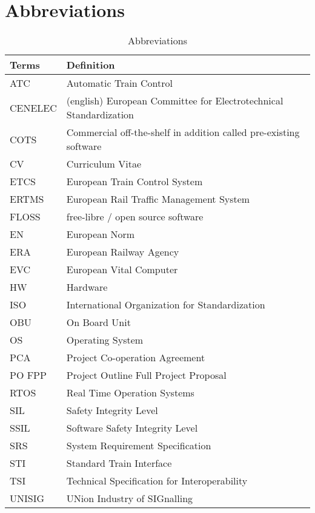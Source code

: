 \documentclass{template/openetcs_report}
\begin{document}
\chapter{Abbreviations}

\begin{table} [h]
\begin{tabular}{|p{2cm}|p{12cm}|}
    \hline\hline
    \bfseries Terms & \bfseries Definition\\
    \hline\hline
    ATC & Automatic Train Control\\
    \hline
    CENELEC & (english) European Committee for Electrotechnical Standardization\\
    \hline
    COTS & Commercial off-the-shelf in addition called pre-existing software\\
    \hline
    CV & Curriculum Vitae\\
    \hline
    ETCS & European Train Control System\\
    \hline
    ERTMS & European Rail Traffic Management System\\
    \hline
    FLOSS & free-libre / open source software\\
    \hline
    EN & European Norm\\
    \hline
    ERA & European Railway Agency\\
    \hline
    EVC & European Vital Computer\\
    \hline
    HW & Hardware\\
    \hline
    ISO & International Organization for Standardization\\
    \hline
    OBU & On Board Unit\\
    \hline
    OS & Operating System\\
    \hline
    PCA & Project Co-operation Agreement\\
    \hline
    PO FPP & Project Outline Full Project Proposal\\
    \hline
    RTOS & Real Time Operation Systems\\
    \hline
    SIL & Safety Integrity Level\\
    \hline
    SSIL & Software Safety Integrity Level\\
    \hline
    SRS & System Requirement Specification \\
    \hline
    STI & Standard Train Interface \\
    \hline
    TSI & Technical Specification for Interoperability\\
    \hline
    UNISIG & UNion Industry of SIGnalling\\
\hline
\end{tabular}
\\
\caption{Abbreviations}
\end{table}
\end{document}
